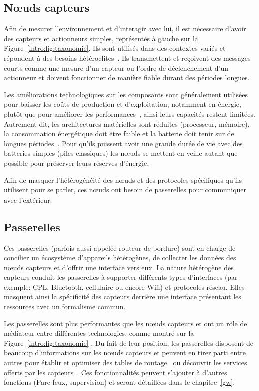 \subsection{Nœuds capteurs}

Afin de mesurer l'environnement et d'interagir avec lui, il est nécessaire d'avoir des capteurs et actionneurs simples, représentés à gauche sur la Figure~\ref{intro:fig:taxonomie}.
Ils sont utilisés dans des contextes variés et répondent à des besoins hétéroclites~\cite{werner2006deploying}.
Ils transmettent et reçoivent des messages courts comme une mesure d'un capteur ou l'ordre de déclenchement d'un actionneur et doivent fonctionner de manière fiable durant des périodes longues.

Les améliorations technologiques sur les composants sont généralement utilisées pour baisser les coûts de production et d'exploitation, notamment en énergie, plutôt que pour améliorer les performances~\cite{murugesan2008harnessing}, ainsi leurs capacités restent limitées.
Autrement dit, les architectures matérielles sont réduites (processeur, mémoire), la consommation énergétique doit être faible et la batterie doit tenir sur de longues périodes~\cite{werner2006deploying}.
Pour qu'ils puissent avoir une grande durée de vie avec des batteries simples (piles classiques) les nœuds se mettent en veille autant que possible pour préserver leurs réserves d'énergie.

Afin de masquer l'hétérogénéité des nœuds et des protocoles spécifiques qu'ils utilisent pour se parler, ces nœuds ont besoin de passerelles pour communiquer avec l'extérieur.

\subsection{Passerelles}

Ces passerelles (parfois aussi appelée routeur de bordure) sont en charge de concilier un écosystème d'appareils hétérogènes, de collecter les données des nœuds capteurs et d'offrir une interface vers eux.
La nature hétérogène des capteurs conduit les passerelles à supporter différents types d'interfaces (par exemple: \ac{CPL}, Bluetooth, cellulaire ou encore Wifi) et protocoles réseau.
Elles masquent ainsi la spécificité des capteurs derrière une interface présentant les ressources avec un formalisme commun.

Les passerelles sont plus performantes que les nœuds capteurs et ont un rôle de médiateur entre différentes technologies, comme montré sur la Figure~\ref{intro:fig:taxonomie} .
Du fait de leur position, les passerelles disposent de beaucoup d'informations sur les nœuds capteurs et peuvent en tirer parti entre autres pour établir et optimiser des tables de routage~\cite{rfc6550} ou découvrir les services offerts par les capteurs~\cite{cirani2014scalable}.
Ces fonctionnalités peuvent s'ajouter à d'autres fonctions (Pare-feux, supervision) et seront détaillées dans le chapitre~\ref{gw}.

